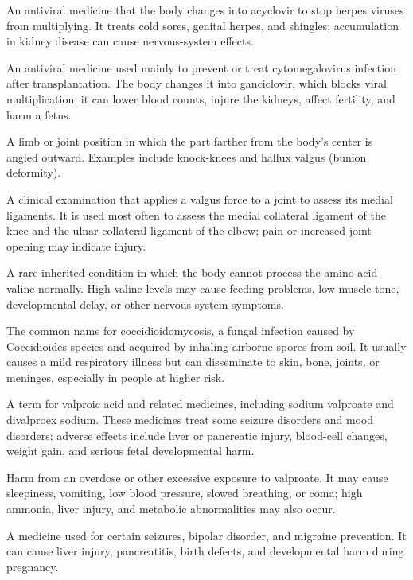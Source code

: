  An antiviral medicine that the body changes into acyclovir to stop herpes viruses from multiplying. It treats cold sores, genital herpes, and shingles; accumulation in kidney disease can cause nervous-system effects.

 An antiviral medicine used mainly to prevent or treat cytomegalovirus infection after transplantation. The body changes it into ganciclovir, which blocks viral multiplication; it can lower blood counts, injure the kidneys, affect fertility, and harm a fetus.

 A limb or joint position in which the part farther from the body's center is angled outward. Examples include knock-knees and hallux valgus (bunion deformity).

 A clinical examination that applies a valgus force to a joint to assess its medial ligaments. It is used most often to assess the medial collateral ligament of the knee and the ulnar collateral ligament of the elbow; pain or increased joint opening may indicate injury.

 A rare inherited condition in which the body cannot process the amino acid valine normally. High valine levels may cause feeding problems, low muscle tone, developmental delay, or other nervous-system symptoms.

 The common name for coccidioidomycosis, a fungal infection caused by Coccidioides
species and acquired by inhaling airborne spores from soil. It usually causes a mild
respiratory illness but can disseminate to skin, bone, joints, or meninges, especially
in people at higher risk.

 A term for valproic acid and related medicines, including sodium valproate and divalproex sodium. These medicines treat some seizure disorders and mood disorders; adverse effects include liver or pancreatic injury, blood-cell changes, weight gain, and serious fetal developmental harm.

 Harm from an overdose or other excessive exposure to valproate. It may cause sleepiness, vomiting, low blood pressure, slowed breathing, or coma; high ammonia, liver injury, and metabolic abnormalities may also occur.

 A medicine used for certain seizures, bipolar disorder, and migraine prevention. It can cause liver injury, pancreatitis, birth defects, and developmental harm during pregnancy.

